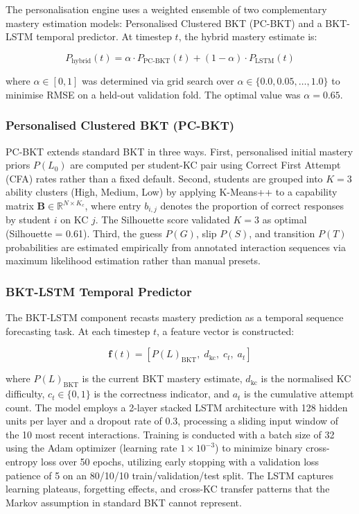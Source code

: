 \documentclass[conference]{IEEEtran}
\begin{document}
The personalisation engine uses a weighted ensemble of two complementary mastery estimation models: Personalised Clustered BKT (PC-BKT) and a BKT-LSTM temporal predictor. At timestep $t$, the hybrid mastery estimate is:

\begin{equation}
P_{\text{hybrid}}(t) = \alpha \cdot P_{\text{PC-BKT}}(t) + (1 - \alpha) \cdot P_{\text{LSTM}}(t)
\label{eq:hybrid}
\end{equation}

\noindent where $\alpha \in [0, 1]$ was determined via grid search over $\alpha \in \{0.0, 0.05, \ldots, 1.0\}$ to minimise RMSE on a held-out validation fold. The optimal value was $\alpha = 0.65$.

\subsubsection{Personalised Clustered BKT (PC-BKT)}
PC-BKT \cite{b16} extends standard BKT \cite{b14} in three ways. First, personalised initial mastery priors $P(L_0)$ are computed per student-KC pair using Correct First Attempt (CFA) rates rather than a fixed default. Second, students are grouped into $K = 3$ ability clusters (High, Medium, Low) by applying K-Means++ to a capability matrix $\mathbf{B} \in \mathbb{R}^{N \times K_c}$, where entry $b_{i,j}$ denotes the proportion of correct responses by student $i$ on KC $j$. The Silhouette score validated $K = 3$ as optimal (Silhouette = 0.61). Third, the guess $P(G)$, slip $P(S)$, and transition $P(T)$ probabilities are estimated empirically from annotated interaction sequences via maximum likelihood estimation rather than manual presets.

\subsubsection{BKT-LSTM Temporal Predictor}
The BKT-LSTM component \cite{b19} recasts mastery prediction as a temporal sequence forecasting task. At each timestep $t$, a feature vector is constructed:

\begin{equation}
\mathbf{f}(t) = [P(L)_{\text{BKT}},\; d_{\text{kc}},\; c_t,\; a_t]
\label{eq:feature}
\end{equation}

\noindent where $P(L)_{\text{BKT}}$ is the current BKT mastery estimate, $d_{\text{kc}}$ is the normalised KC difficulty, $c_t \in \{0, 1\}$ is the correctness indicator, and $a_t$ is the cumulative attempt count. The model employs a 2-layer stacked LSTM architecture with 128 hidden units per layer and a dropout rate of 0.3, processing a sliding input window of the 10 most recent interactions. Training is conducted with a batch size of 32 using the Adam optimizer (learning rate $1 \times 10^{-3}$) to minimize binary cross-entropy loss over 50 epochs, utilizing early stopping with a validation loss patience of 5 on an 80/10/10 train/validation/test split. The LSTM captures learning plateaus, forgetting effects, and cross-KC transfer patterns that the Markov assumption in standard BKT cannot represent.
\end{document}
